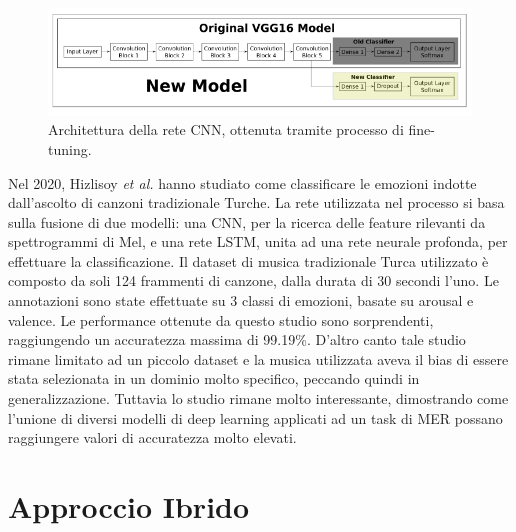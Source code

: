 \documentclass[11pt]{report}
\begin{document}
\vspace{1cm}

\begin{figure}[h]
\centering
\includegraphics[scale = 0.65]{img/vgg16.PNG}
\caption[Architettura della rete CNN, ottenuta tramite processo di fine-tuning]{Architettura della rete CNN, ottenuta tramite processo di fine-tuning\footnotemark.}
\label{fig-vgg}
\end{figure}




\vspace{1cm}


Nel 2020, Hizlisoy \textit{et al.}\cite{hizlisoy2021music} hanno studiato come classificare le emozioni indotte dall'ascolto di canzoni tradizionale Turche. La rete utilizzata nel processo si basa sulla fusione di due modelli: una CNN, per la ricerca delle feature rilevanti da spettrogrammi di Mel, e una rete LSTM, unita ad una rete neurale profonda, per effettuare la classificazione. Il dataset di musica tradizionale Turca utilizzato è composto da soli 124 frammenti di canzone, dalla durata di 30 secondi l'uno. Le annotazioni sono state effettuate su 3 classi di emozioni, basate su arousal e valence. Le performance ottenute da questo studio sono sorprendenti, raggiungendo un accuratezza massima di 99.19\%. D'altro canto tale studio rimane limitato ad un piccolo dataset e la musica utilizzata aveva il bias di essere stata selezionata in un dominio molto specifico, peccando quindi in generalizzazione. Tuttavia lo studio rimane molto interessante, dimostrando come l'unione di diversi modelli di deep learning applicati ad un task di MER possano raggiungere valori di accuratezza molto elevati.



\newpage

\section{Approccio Ibrido}
\end{document}

